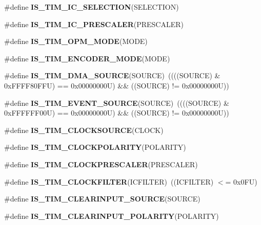 \begin{DoxyCompactItemize}
\item 
\#define {\bfseries I\+S\+\_\+\+T\+I\+M\+\_\+\+I\+C\+\_\+\+S\+E\+L\+E\+C\+T\+I\+ON}(S\+E\+L\+E\+C\+T\+I\+ON)
\item 
\#define {\bfseries I\+S\+\_\+\+T\+I\+M\+\_\+\+I\+C\+\_\+\+P\+R\+E\+S\+C\+A\+L\+ER}(P\+R\+E\+S\+C\+A\+L\+ER)
\item 
\#define {\bfseries I\+S\+\_\+\+T\+I\+M\+\_\+\+O\+P\+M\+\_\+\+M\+O\+DE}(M\+O\+DE)
\item 
\#define {\bfseries I\+S\+\_\+\+T\+I\+M\+\_\+\+E\+N\+C\+O\+D\+E\+R\+\_\+\+M\+O\+DE}(M\+O\+DE)
\item 
\mbox{\label{group___t_i_m___private___macros_gafb9cb1995ea4cd37db6032d80a49cd47}} 
\#define {\bfseries I\+S\+\_\+\+T\+I\+M\+\_\+\+D\+M\+A\+\_\+\+S\+O\+U\+R\+CE}(S\+O\+U\+R\+CE)~((((S\+O\+U\+R\+CE) \& 0x\+F\+F\+F\+F80\+F\+F\+U) == 0x00000000\+U) \&\& ((\+S\+O\+U\+R\+C\+E) != 0x00000000\+U))
\item 
\mbox{\label{group___t_i_m___private___macros_ga4ac88c3e43c8250114ea81a6e052d58a}} 
\#define {\bfseries I\+S\+\_\+\+T\+I\+M\+\_\+\+E\+V\+E\+N\+T\+\_\+\+S\+O\+U\+R\+CE}(S\+O\+U\+R\+CE)~((((S\+O\+U\+R\+CE) \& 0x\+F\+F\+F\+F\+F\+F00\+U) == 0x00000000\+U) \&\& ((\+S\+O\+U\+R\+C\+E) != 0x00000000\+U))
\item 
\#define {\bfseries I\+S\+\_\+\+T\+I\+M\+\_\+\+C\+L\+O\+C\+K\+S\+O\+U\+R\+CE}(C\+L\+O\+CK)
\item 
\#define {\bfseries I\+S\+\_\+\+T\+I\+M\+\_\+\+C\+L\+O\+C\+K\+P\+O\+L\+A\+R\+I\+TY}(P\+O\+L\+A\+R\+I\+TY)
\item 
\#define {\bfseries I\+S\+\_\+\+T\+I\+M\+\_\+\+C\+L\+O\+C\+K\+P\+R\+E\+S\+C\+A\+L\+ER}(P\+R\+E\+S\+C\+A\+L\+ER)
\item 
\mbox{\label{group___t_i_m___private___macros_gaf1c65e593d3aabc6f7288108cb75aab7}} 
\#define {\bfseries I\+S\+\_\+\+T\+I\+M\+\_\+\+C\+L\+O\+C\+K\+F\+I\+L\+T\+ER}(I\+C\+F\+I\+L\+T\+ER)~((I\+C\+F\+I\+L\+T\+ER) $<$= 0x0\+F\+U)
\item 
\#define {\bfseries I\+S\+\_\+\+T\+I\+M\+\_\+\+C\+L\+E\+A\+R\+I\+N\+P\+U\+T\+\_\+\+S\+O\+U\+R\+CE}(S\+O\+U\+R\+CE)
\item 
\#define {\bfseries I\+S\+\_\+\+T\+I\+M\+\_\+\+C\+L\+E\+A\+R\+I\+N\+P\+U\+T\+\_\+\+P\+O\+L\+A\+R\+I\+TY}(P\+O\+L\+A\+R\+I\+TY)
\item 

\end{DoxyCompactItemize}
